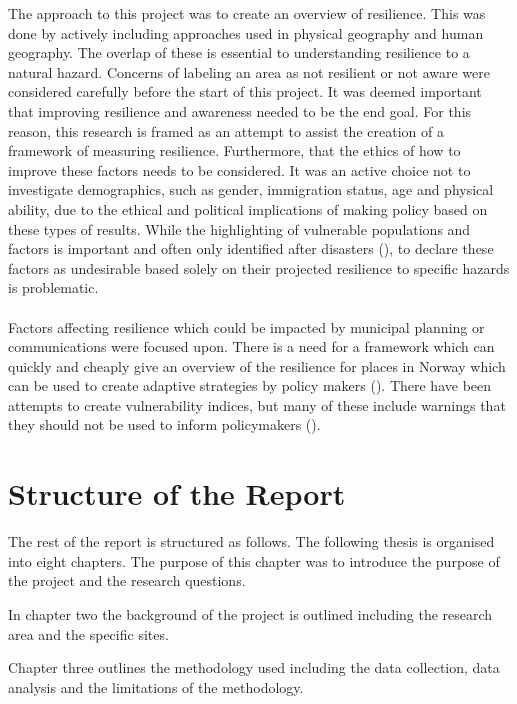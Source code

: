 The approach to this project was to create an overview of resilience. This was done by actively including approaches used in physical geography and human geography. The overlap of these is essential to understanding resilience to a natural hazard. Concerns of labeling an area as not resilient or not aware were considered carefully before the start of this project.  It was deemed important that improving resilience and awareness needed to be the end goal. For this reason, this research is framed as an attempt to assist the creation of a framework of measuring resilience. Furthermore, that the ethics of how to improve these factors needs to be considered. It was an active choice not to investigate demographics, such as gender, immigration status, age and physical ability, due to the ethical and political implications of making policy based on these types of results. While the highlighting of vulnerable populations and factors is important and often only identified after disasters (\cite{cutter_community_2020}), to declare these factors as undesirable based solely on their projected resilience to specific hazards is problematic. 

\paragraph{}
Factors affecting resilience which could be impacted by municipal planning or communications were focused upon. There is a need for a framework which can quickly and cheaply give an overview of the resilience for places in Norway which can be used to create adaptive strategies by policy makers (\cite{opach_seeking_2020}). There have been attempts to create vulnerability indices, but many of these include warnings that they should not be used to inform policymakers (\cite{opach_seeking_2020}).


\section{Structure of the Report}
The rest of the report is structured as follows. 
The following thesis is organised into eight chapters. The purpose of this chapter was to introduce the purpose of the project and the research questions.

In chapter two the background of the project is outlined including the research area and the specific sites. 

Chapter three outlines the methodology used including the data collection, data analysis and the limitations of the methodology.

